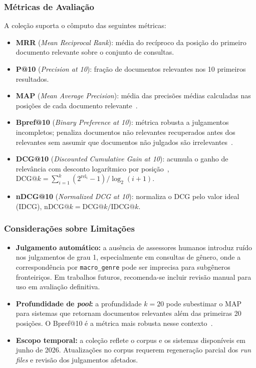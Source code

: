 \documentclass[12pt]{article}
\begin{document}
\subsubsection{Métricas de Avaliação}

A coleção suporta o cômputo das seguintes métricas:

\begin{itemize}
  \item \textbf{MRR} (\textit{Mean Reciprocal Rank}): média do recíproco da
    posição do primeiro documento relevante sobre o conjunto de
    consultas.
  \item \textbf{P@10} (\textit{Precision at 10}): fração de documentos relevantes
    nos 10 primeiros resultados.
  \item \textbf{MAP} (\textit{Mean Average Precision}): média das precisões
    médias calculadas nas posições de cada documento
    relevante~\cite{baezayates1999modern}.
  \item \textbf{Bpref@10} (\textit{Binary Preference at 10}): métrica robusta a
    julgamentos incompletos; penaliza documentos não relevantes recuperados
    antes dos relevantes sem assumir que documentos não julgados são
    irrelevantes~\cite{buckley2004retrieval}.
  \item \textbf{DCG@10} (\textit{Discounted Cumulative Gain at 10}): acumula o
    ganho de relevância com desconto logarítmico por
    posição~\cite{jarvelin2002cumulated}, $\text{DCG@}k = \sum_{i=1}^{k}
    (2^{\text{rel}_i} - 1) / \log_2(i+1)$.
  \item \textbf{nDCG@10} (\textit{Normalized DCG at 10}): normaliza o DCG pelo
    valor ideal (IDCG), $\text{nDCG@}k = \text{DCG@}k / \text{IDCG@}k$.
\end{itemize}

\subsubsection{Considerações sobre Limitações}
\label{sec:limitacoes}

\begin{itemize}
  \item \textbf{Julgamento automático:} a ausência de assessores humanos
    introduz ruído nos julgamentos de grau 1, especialmente em consultas de
    gênero, onde a correspondência por \texttt{macro\_genre} pode ser imprecisa
    para subgêneros fronteiriços. Em trabalhos futuros, recomenda-se incluir
    revisão manual para uso em avaliação definitiva.
  \item \textbf{Profundidade de \textit{pool}:} a profundidade $k = 20$ pode
    subestimar o MAP para sistemas que retornam documentos relevantes além das
    primeiras 20 posições. O Bpref@10 é a métrica mais robusta nesse
    contexto~\cite{buckley2004retrieval}.
  \item \textbf{Escopo temporal:} a coleção reflete o corpus e os sistemas
    disponíveis em junho de 2026. Atualizações no corpus requerem regeneração
    parcial dos \textit{run files} e revisão dos julgamentos afetados.
\end{itemize}
\end{document}

